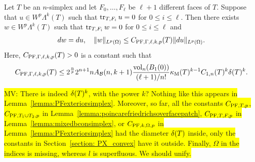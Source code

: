 \documentclass[10pt,letterpaper]{article}
\newcommand{\todo}[1]{{\colorbox{yellow}{#1}}}
\begin{document}
\begin{lemma}\label{lemma:mixedbconsimplex:exteriorderivative}
    Let $T$ be an $n$-simplex 
    and let $F_{0},\dots,F_{\ell}$ be $\ell+1$ different faces of $T$. 
    Suppose that $u \in W^{p}\Lambda^{k}(T)$ such that 
    $\operatorname{tr}_{T,F_i} u = 0$ for $0 \leq i \leq \ell$.
    Then there exists $w \in W^{p}\Lambda^{k}(T)$ such that 
    $\operatorname{tr}_{T,F_i} w = 0$ for $0 \leq i \leq \ell$
    and  
    \begin{align*}
        d w = d u,
        \quad 
        \| w \|_{L^{p}(\Omega)} 
        \leq 
        C_{{\rm PF},\Gamma,\ell,k,p}(T)
        \| d u \|_{L^{p}(\Omega)}
        .
    \end{align*}
    Here, $C_{{\rm PF},\Gamma,\ell,k,p}(T) > 0$ is a constant such that 
    \begin{align*}
        C_{{\rm PF},\Gamma,\ell,k,p}(T)
        \leq 
        2^{\frac n p}
        2^{n+1} n A_{{\mathcal B}}(n,k+1) \frac{ \operatorname{vol}_{n}(B_1(0)) }{ (\ell+1)/n! } 
        \kappa_{\rm M}(T)^{k-1}
        C_{1,n}(T)^{k}
        {\delta}(T)^{k} 
        .
    \end{align*}
\end{lemma}
\todo{MV: There is indeed ${\delta}(T)^{k}$, with the power $k$? Nothing like this appears in Lemma~\ref{lemma:PFexteriorsimplex}. Moreover, so far, all the constants $C_{{\rm{PF}},T,p}$, $C_{{\rm{PF}},T_1 \cup T_2,p}$ in Lemma~\ref{lemma:poincarefriedrichsoverfacepatch}, $C_{{\rm PF},T,F,p}$ in Lemma~\ref{lemma:mixedbconsimplex}, or $C_{{\rm{PF}},k,\Omega,p}$ in Lemma~\ref{lemma:PFexteriorsimplex} had the diameter ${\delta}(T)$ inside, only the constants in Section~\ref{section: PX_convex} have it outside. Finally, $\Omega$ in the indices is missing, whereas $l$ is superfluous. We should unify.}
\end{document}
